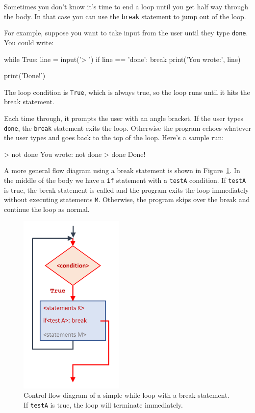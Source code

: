 Sometimes you don't know it's time to end a loop until you get half
way through the body.  In that case you can use the {\tt break}
statement to jump out of the loop.

For example, suppose you want to take input from the user until they
type {\tt done}.  You could write:

\beforeverb
\begin{pycode}
while True:
    line = input('> ')
    if line == 'done':
        break
    print('You wrote:', line)

print('Done!')
\end{pycode}
\afterverb
%
The loop condition is {\tt True}, which is always true, so the
loop runs until it hits the break statement.

Each time through, it prompts the user with an angle bracket.
If the user types {\tt done}, the {\tt break} statement exits
the loop.  Otherwise the program echoes whatever the user types
and goes back to the top of the loop.  Here's a sample run:

\beforeverb
\begin{pyoutput}
> not done
You wrote: not done
> done
Done!
\end{pyoutput}
\afterverb
%

A more general flow diagram using a break statement is shown in Figure~\ref{fig:loop-break-diagram}. In the middle of the body we have a {\tt if} statement with a {\tt testA} condition. If {\tt testA} is true, the break statement is called and the program exits the loop immediately without executing statements {\tt M}. Otherwise, the program skips over the break and continue the loop as normal.

\begin{figure}[htb]%
\begin{center}
\includegraphics[height=9cm]{figs/simple-loop-break-diagram.png}%
\caption{Control flow diagram of a simple while loop with a break statement. If {\tt testA} is true, the loop will terminate immediately.}%
\label{fig:loop-break-diagram}%
\end{center}
\end{figure}

